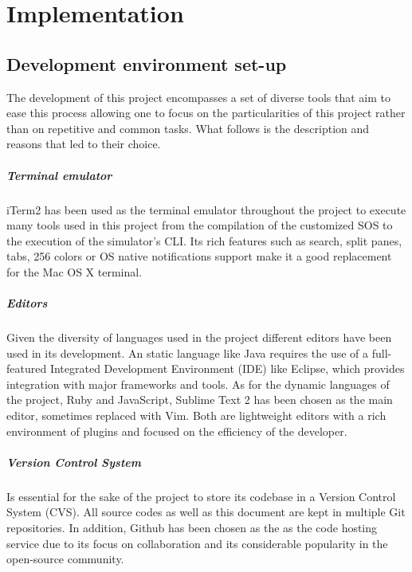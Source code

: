 \chapter{Implementation}

\section{Development environment set-up}

The development of this project encompasses a set of diverse tools that aim to ease this process allowing one to focus on the particularities of this project rather than on repetitive and common tasks. What follows is the description and reasons that led to their choice.

\paragraph{Terminal emulator} iTerm2 has been used as the terminal emulator throughout the project to execute many tools used in this project from the compilation of the customized SOS to the execution of the simulator's CLI. Its rich features such as search, split panes, tabs, 256 colors or OS native notifications support make it a good replacement for the Mac OS X terminal.

\paragraph{Editors} Given the diversity of languages used in the project different editors have been used in its development. An static language like Java requires the use of a full-featured Integrated Development Environment (IDE) like Eclipse, which provides integration with major frameworks and tools. As for the dynamic languages of the project, Ruby and JavaScript, Sublime Text 2 has been chosen as the main editor, sometimes replaced with Vim. Both are lightweight editors with a rich environment of plugins and focused on the efficiency of the developer.

\paragraph{Version Control System} Is essential for the sake of the project to store its codebase in a Version Control System (CVS). All source codes as well as this document are kept in multiple Git repositories. In addition, Github has been chosen as the as the code hosting service due to its focus on collaboration and its considerable popularity in the open-source community.
	
